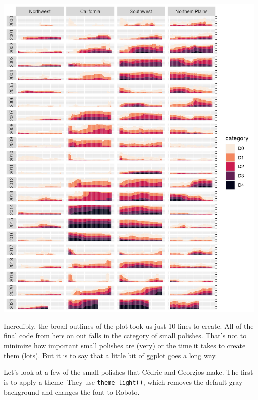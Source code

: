 \documentclass[
]{book}
\begin{document}
\includegraphics[width=1\linewidth]{data-viz_files/figure-latex/unnamed-chunk-34-1}

Incredibly, the broad outlines of the plot took us just 10 lines to create. All of the final code from here on out falls in the category of small polishes. That's not to minimize how important small polishes are (very) or the time it takes to create them (lots). But it is to say that a little bit of ggplot goes a long way.

Let's look at a few of the small polishes that Cédric and Georgios make. The first is to apply a theme. They use \texttt{theme\_light()}, which removes the default gray background and changes the font to Roboto.
\end{document}
